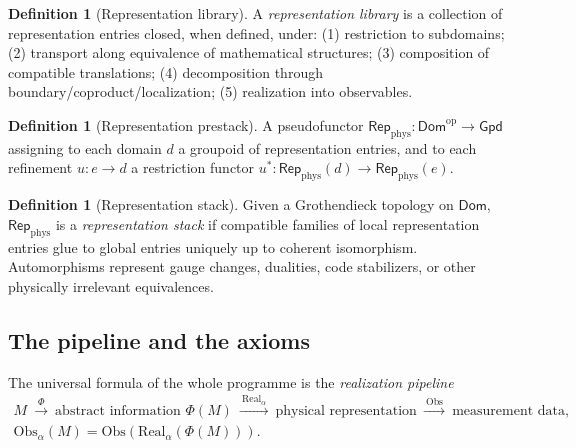\documentclass[12pt]{article}
\theoremstyle{definition}
\newtheorem{definition}[theorem]{Definition}
\theoremstyle{remark}
\newcommand{\Dom}{\mathsf{Dom}}
\newcommand{\Gpd}{\mathsf{Gpd}}
\newcommand{\Real}{\mathrm{Real}}
\newcommand{\Obs}{\mathrm{Obs}}
\newcommand{\Repphys}{\mathsf{Rep}_{\mathrm{phys}}}
\newcommand{\op}{\mathrm{op}}
\begin{document}
\begin{definition}[Representation library]
\label{def:library}
A \emph{representation library} is a collection of representation entries closed,
when defined, under: (1) restriction to subdomains; (2) transport along equivalence
of mathematical structures; (3) composition of compatible translations; (4)
decomposition through boundary/coproduct/localization; (5) realization into
observables.
\end{definition}

\begin{definition}[Representation prestack]
\label{def:prestack}
A pseudofunctor $\Repphys:\Dom^\op\to\Gpd$ assigning to each domain $d$ a groupoid of
representation entries, and to each refinement $u:e\to d$ a restriction functor
$u^*:\Repphys(d)\to\Repphys(e)$.
\end{definition}

\begin{definition}[Representation stack]
\label{def:stack}
Given a Grothendieck topology on $\Dom$, $\Repphys$ is a \emph{representation stack}
if compatible families of local representation entries glue to global entries
uniquely up to coherent isomorphism.  Automorphisms represent gauge changes,
dualities, code stabilizers, or other physically irrelevant equivalences.
\end{definition}

\subsection{The pipeline and the axioms}

The universal formula of the whole programme is the \emph{realization pipeline}
\begin{equation}
\label{eq:pipeline}
\begin{gathered}
M\ \xrightarrow{\ \Phi\ }\ \text{abstract information }\Phi(M)\
\xrightarrow{\ \Real_\alpha\ }\ \text{physical representation}\
\xrightarrow{\ \Obs\ }\ \text{measurement data},\\[4pt]
\Obs_\alpha(M)=\Obs(\Real_\alpha(\Phi(M))).
\end{gathered}
\end{equation}
\end{document}
